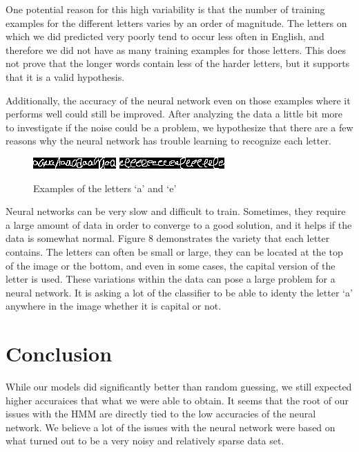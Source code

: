\documentclass[11pt,a4paper,twocolumn]{article}
\begin{document}
One potential reason for this high variability is that the number of training examples for the
different letters varies by an order of magnitude. The letters on which we did predicted very poorly
tend to occur less often in English, and therefore we did not have as many training examples for
those letters. This does not prove that the longer words contain less of the harder letters, but it
supports that it is a valid hypothesis. 

Additionally, the accuracy of the neural network even on those examples where
it performs well could still be improved. After analyzing the data a little bit
more to investigate if the noise could be a problem, we hypothesize that there
are a few reasons why the neural network has trouble learning to recognize each
letter. 

\begin{figure}[h]
\centering
\caption{Examples of the letters `a' and `e'}
\includegraphics[scale=1.0]{img/aa.jpg}
\includegraphics[scale=1.0]{img/ee.jpg}
\label{sampleLetters}
\end{figure}

Neural networks can be very slow and difficult to train. Sometimes, they
require a large amount of data in order to converge to a good solution, and it
helps if the data is somewhat normal. Figure 8 demonstrates the variety that
each letter contains. The letters can often be small or large, they can be
located at the top of the image or the bottom, and even in some cases, the
capital version of the letter is used. These variations within the data can
pose a large problem for a neural network. It is asking a lot of the classifier
to be able to identy the letter `a' anywhere in the image whether it is capital
or not.

\section{Conclusion}

While our models did significantly better than random guessing, we still expected higher accuraices
that what we were able to obtain. It seems that the root of our issues with the HMM are directly
tied to the low accuracies of the neural network. We believe a lot of the issues with the neural
network were based on what turned out to be a very noisy and relatively sparse data set. 
\end{document}
